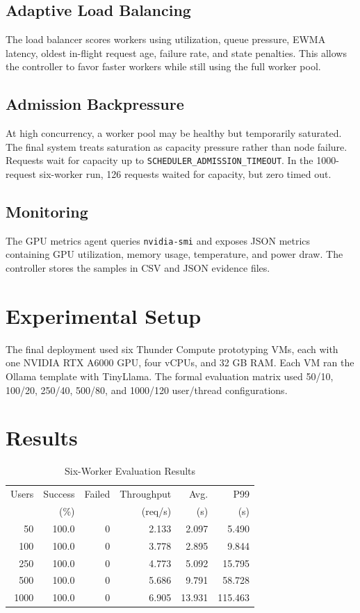 \documentclass[conference]{IEEEtran}
\begin{document}
\subsection{Adaptive Load Balancing}
The load balancer scores workers using utilization, queue pressure, EWMA latency, oldest in-flight request age, failure rate, and state penalties. This allows the controller to favor faster workers while still using the full worker pool.

\subsection{Admission Backpressure}
At high concurrency, a worker pool may be healthy but temporarily saturated. The final system treats saturation as capacity pressure rather than node failure. Requests wait for capacity up to \texttt{SCHEDULER\_ADMISSION\_TIMEOUT}. In the 1000-request six-worker run, 126 requests waited for capacity, but zero timed out.

\subsection{Monitoring}
The GPU metrics agent queries \texttt{nvidia-smi} and exposes JSON metrics containing GPU utilization, memory usage, temperature, and power draw. The controller stores the samples in CSV and JSON evidence files.

\section{Experimental Setup}
The final deployment used six Thunder Compute prototyping VMs, each with one NVIDIA RTX A6000 GPU, four vCPUs, and 32 GB RAM. Each VM ran the Ollama template with TinyLlama. The formal evaluation matrix used 50/10, 100/20, 250/40, 500/80, and 1000/120 user/thread configurations.

\section{Results}
\begin{table}[h]
\caption{Six-Worker Evaluation Results}
\centering
\begin{tabular}{rrrrrr}
\toprule
Users & Success & Failed & Throughput & Avg. & P99 \\
 & (\%) & & (req/s) & (s) & (s) \\
\midrule
50 & 100.0 & 0 & 2.133 & 2.097 & 5.490 \\
100 & 100.0 & 0 & 3.778 & 2.895 & 9.844 \\
250 & 100.0 & 0 & 4.773 & 5.092 & 15.795 \\
500 & 100.0 & 0 & 5.686 & 9.791 & 58.728 \\
1000 & 100.0 & 0 & 6.905 & 13.931 & 115.463 \\
\bottomrule
\end{tabular}
\end{table}
\end{document}
